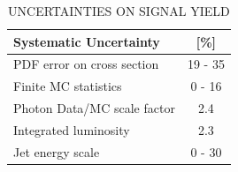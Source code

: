 \begin{table}
  \centering
  \caption{UNCERTAINTIES ON SIGNAL YIELD}
  \begin{tabular}{ | l | c | }
    \hline
    \hline
        Systematic Uncertainty & [\%] \\

    \hline
        PDF error on cross section & 19 - 35 \\
        Finite MC statistics & 0 - 16 \\
        Photon Data/MC scale factor & 2.4 \\                                                                                   
    	Integrated luminosity & 2.3 \\
    Jet energy scale & 0 - 30\\                                                                                                                      
    \hline
    \hline
  \end{tabular}
  \label{tab:SysUncert}
\end{table}


